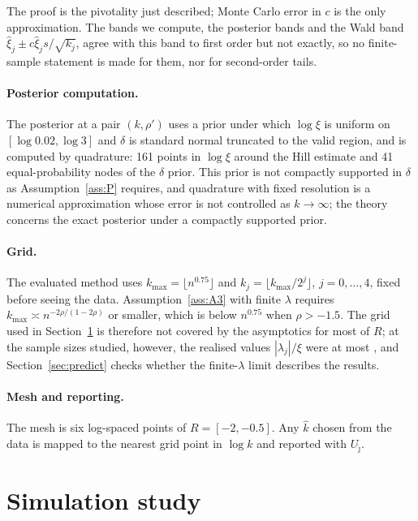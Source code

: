 \documentclass[11pt]{article}
\theoremstyle{definition}
\theoremstyle{remark}
\numberwithin{equation}{section}
\begin{document}
The proof is the pivotality just described; Monte Carlo error in $c$ is the only approximation. The bands we compute, the posterior bands and the Wald band $\hat\xi_j\pm c\hat\xi_js/\sqrt{k_j}$, agree with this band to first order but not exactly, so no finite-sample statement is made for them, nor for second-order tails.

\paragraph{Posterior computation.} The posterior at a pair $(k,\rho')$ uses a prior under which $\log\xi$ is uniform on $[\log0.02,\log3]$ and $\delta$ is standard normal truncated to the valid region, and is computed by quadrature: 161 points in $\log\xi$ around the Hill estimate and 41 equal-probability nodes of the $\delta$ prior. This prior is not compactly supported in $\delta$ as Assumption~\ref{ass:P} requires, and quadrature with fixed resolution is a numerical approximation whose error is not controlled as $k\to\infty$; the theory concerns the exact posterior under a compactly supported prior.

\paragraph{Grid.} The evaluated method uses $k_{\max}=\lfloor n^{0.75}\rfloor$ and $k_j=\lfloor k_{\max}/2^{j}\rfloor$, $j=0,\dots,4$, fixed before seeing the data. Assumption~\ref{ass:A3} with finite $\lambda$ requires $k_{\max}\asymp n^{-2\rho/(1-2\rho)}$ or smaller, which is below $n^{0.75}$ when $\rho>-1.5$. The grid used in Section~\ref{sec:sim} is therefore not covered by the asymptotics for most of $R$; at the sample sizes studied, however, the realised values $|\lambda_j|/\xi$ were at most \lamBenchMax, and Section~\ref{sec:predict} checks whether the finite-$\lambda$ limit describes the results.

\paragraph{Mesh and reporting.} The mesh is six log-spaced points of $R=[-2,-0.5]$. Any $\hat k$ chosen from the data is mapped to the nearest grid point in $\log k$ and reported with $U_{\hat\jmath}$.

\section{Simulation study}\label{sec:sim}
\end{document}
